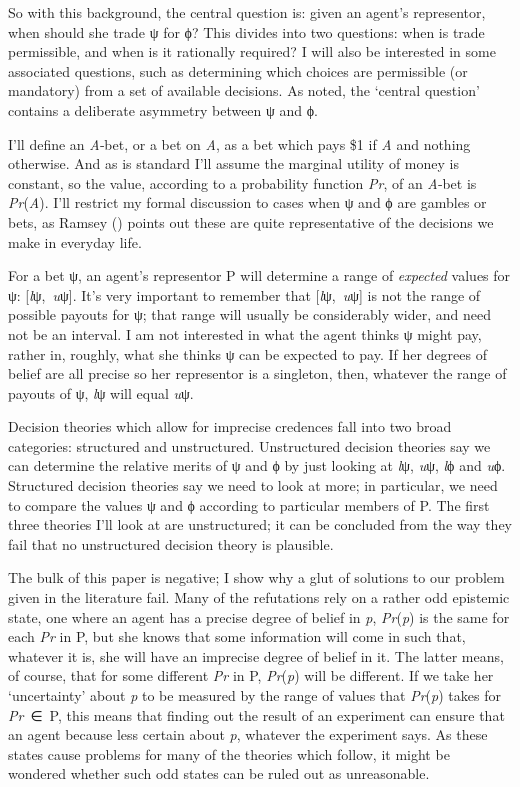 \documentclass[
  10pt,
  letterpaper,
  DIV=11,
  numbers=noendperiod,
  twoside]{scrartcl}
\begin{document}
So with this background, the central question is: given an agent's
representor, when should she trade ψ for ϕ? This divides into two
questions: when is trade permissible, and when is it rationally
required? I will also be interested in some associated questions, such
as determining which choices are permissible (or mandatory) from a set
of available decisions. As noted, the `central question' contains a
deliberate asymmetry between ψ and ϕ.

I'll define an \emph{A}‑bet, or a bet on \emph{A}, as a bet which pays
\$1 if \emph{A} and nothing otherwise. And as is standard I'll assume
the marginal utility of money is constant, so the value, according to a
probability function \emph{Pr}, of an \emph{A}‑bet is
\emph{Pr}(\emph{A}). I'll restrict my formal discussion to cases when ψ
and ϕ are gambles or bets, as Ramsey
() points out these are quite
representative of the decisions we make in everyday life.

For a bet ψ, an agent's representor P will determine a range of
\emph{expected} values for ψ: {[}\emph{l}ψ,~\emph{u}ψ{]}. It's very
important to remember that {[}\emph{l}ψ,~\emph{u}ψ{]} is not the range
of possible payouts for ψ; that range will usually be considerably
wider, and need not be an interval. I am not interested in what the
agent thinks ψ might pay, rather in, roughly, what she thinks ψ can be
expected to pay. If her degrees of belief are all precise so her
representor is a singleton, then, whatever the range of payouts of ψ,
\emph{l}ψ will equal \emph{u}ψ.

Decision theories which allow for imprecise credences fall into two
broad categories: structured and unstructured. Unstructured decision
theories say we can determine the relative merits of ψ and ϕ by just
looking at \emph{l}ψ, \emph{u}ψ, \emph{l}ϕ and \emph{u}ϕ. Structured
decision theories say we need to look at more; in particular, we need to
compare the values ψ and ϕ according to particular members of P. The
first three theories I'll look at are unstructured; it can be concluded
from the way they fail that no unstructured decision theory is
plausible.

The bulk of this paper is negative; I show why a glut of solutions to
our problem given in the literature fail. Many of the refutations rely
on a rather odd epistemic state, one where an agent has a precise degree
of belief in \emph{p}, \emph{Pr}(\emph{p}) is the same for each
\emph{Pr} in P, but she knows that some information will come in such
that, whatever it is, she will have an imprecise degree of belief in it.
The latter means, of course, that for some different \emph{Pr} in P,
\emph{Pr}(\emph{p}) will be different. If we take her `uncertainty'
about \emph{p} to be measured by the range of values that
\emph{Pr}(\emph{p}) takes for \emph{Pr}~∈~P, this means that finding out
the result of an experiment can ensure that an agent because less
certain about \emph{p}, whatever the experiment says. As these states
cause problems for many of the theories which follow, it might be
wondered whether such odd states can be ruled out as unreasonable.
\end{document}
